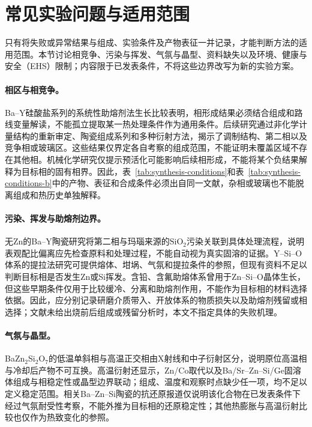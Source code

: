 \section{常见实验问题与适用范围}
\label{sec:failure-boundaries}

只有将失败或异常结果与组成、实验条件及产物表征一并记录，才能判断方法的适用范围。本节讨论相竞争、污染与挥发、气氛与晶型、资料缺失以及环境、健康与安全（EHS）限制；内容限于已发表条件，不将这些边界改写为新的实验方案。

\paragraph{相区与相竞争。}
Ba--Y硅酸盐系列的系统性助熔剂法生长比较表明，相形成结果必须结合组成和路线变量解读，不能孤立提取某一热处理条件作为通用条件\cite{wierzbickawieczorek2017high}。后续研究通过非化学计量结构的重新审定、陶瓷组成系列和多种衍射方法，揭示了调制结构、第二相以及竞争相或玻璃区\cite{yamane2024synthesis,yamane2024microstructure,gulay2024navigation}。这些结果仅界定各自考察的组成范围，不能证明未覆盖区域不存在其他相。机械化学研究仅提示预活化可能影响后续相形成，不能将某个负结果解释为目标相的固有相界\cite{tzvetkov2001effects}。因此，表~\ref{tab:synthesis-conditions}\CJKecglue{}和表~\ref{tab:synthesis-conditions-b}\CJKecglue{}中的产物、表征和合成条件必须出自同一文献，杂相或玻璃也不能脱离组成和热历史单独解释。

\paragraph{污染、挥发与助熔剂边界。}
无Zn的Ba--Y陶瓷研究将第二相与玛瑙来源的\(\mathrm{SiO_2}\)污染关联到具体处理流程，说明表观配比偏离应先检查原料和处理过程，不能自动视为真实固溶的证据\cite{yamane2024microstructure}。Y--Si--O体系的提拉法研究可提供熔体、坩埚、气氛和提拉条件的参照，但现有资料不足以判断目标相是否发生Zn或Si挥发\cite{shoudu1999czochralski}。含铅、含氟助熔体系曾用于Zn--Si--O晶体生长，但这些早期条件仅用于比较缓冷、分离和助熔剂作用，不能作为目标相的材料选择依据\cite{giess1982zn2sio4}。因此，应分别记录研磨介质带入、开放体系的物质损失以及助熔剂残留或相选择；文献未给出烧前后组成或残留分析时，本文不指定具体的失败机理。

\paragraph{气氛与晶型。}
BaZn$_2$Si$_2$O$_7$的低温单斜相与高温正交相由X射线和中子衍射区分，说明原位高温相与冷却后产物不可互换\cite{lin1999phase}。高温衍射还显示，Zn\slash Co取代以及Ba\slash Sr--Zn--Si\slash Ge固溶体组成与相稳定性或晶型边界联动；组成、温度和观察时点缺少任一项，均不足以定义稳定范围\cite{kerstan2013bazn2si2o7,thieme2016negative}。相关Ba--Zn--Si陶瓷的抗还原报道仅说明该化合物在已发表条件下经过气氛耐受性考察，不能外推为目标相的还原稳定性\cite{zou2019anti}；其他热膨胀与高温衍射比较也仅作为热致变化的参照\cite{kerstan2012thermal}。

